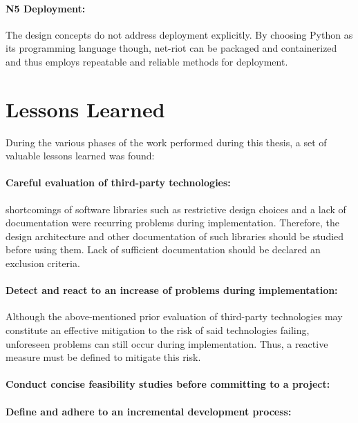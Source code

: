 \paragraph{N5 Deployment:} The design concepts do not address deployment explicitly. By choosing Python as its programming language though, net-riot can be packaged and containerized and thus employs repeatable and reliable methods for deployment.

\section{Lessons Learned}
\label{sec:pm-lessons-learned}
During the various phases of the work performed during this thesis, a set of valuable lessons learned was found:
\paragraph{Careful evaluation of third-party technologies:} shortcomings of software libraries such as restrictive design choices and a lack of documentation were recurring problems during implementation. Therefore, the design architecture and other documentation of such libraries should be studied before using them. Lack of sufficient documentation should be declared an exclusion criteria. 
\paragraph{Detect and react to an increase of problems during implementation:} Although the above-mentioned prior evaluation of third-party technologies may constitute an effective mitigation to the risk of said technologies failing, unforeseen problems can still occur during implementation. Thus, a reactive measure must be defined to mitigate this risk.
\paragraph{Conduct concise feasibility studies before committing to a project:}
\paragraph{Define and adhere to an incremental development process:}